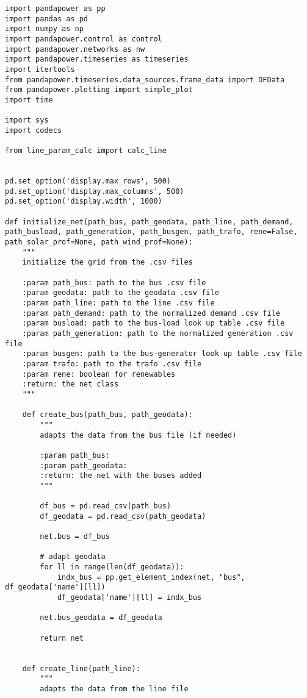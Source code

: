 \begin{lstlisting}[caption={Main code in Python with the Pandapower library}]
import pandapower as pp
import pandas as pd
import numpy as np
import pandapower.control as control
import pandapower.networks as nw
import pandapower.timeseries as timeseries
import itertools
from pandapower.timeseries.data_sources.frame_data import DFData
from pandapower.plotting import simple_plot
import time

import sys
import codecs

from line_param_calc import calc_line


pd.set_option('display.max_rows', 500)
pd.set_option('display.max_columns', 500)
pd.set_option('display.width', 1000)

def initialize_net(path_bus, path_geodata, path_line, path_demand, path_busload, path_generation, path_busgen, path_trafo, rene=False, path_solar_prof=None, path_wind_prof=None):
    """
    initialize the grid from the .csv files

    :param path_bus: path to the bus .csv file
    :param geodata: path to the geodata .csv file
    :param path_line: path to the line .csv file
    :param path_demand: path to the normalized demand .csv file
    :param busload: path to the bus-load look up table .csv file
    :param path_generation: path to the normalized generation .csv file
    :param busgen: path to the bus-generator look up table .csv file
    :param trafo: path to the trafo .csv file
    :param rene: boolean for renewables
    :return: the net class
    """

    def create_bus(path_bus, path_geodata):
        """
        adapts the data from the bus file (if needed)

        :param path_bus:
        :param path_geodata:
        :return: the net with the buses added
        """

        df_bus = pd.read_csv(path_bus)
        df_geodata = pd.read_csv(path_geodata)

        net.bus = df_bus

        # adapt geodata
        for ll in range(len(df_geodata)):
            indx_bus = pp.get_element_index(net, "bus", df_geodata['name'][ll])
            df_geodata['name'][ll] = indx_bus

        net.bus_geodata = df_geodata

        return net


    def create_line(path_line):
        """
        adapts the data from the line file


\end{lstlisting}
